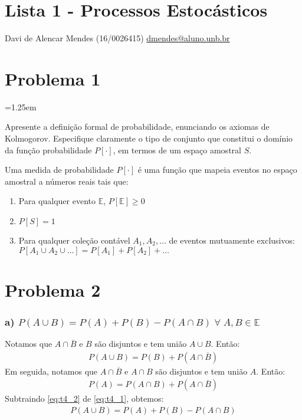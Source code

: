 \documentclass{article}
\newcommand\ov[1]{\overline{#1}}
\newenvironment{nscenter}
 {\parskip=1.25em\par\nopagebreak\centering}
 {\par\noindent\ignorespacesafterend}
\begin{document}
\setlength{\abovedisplayskip}{12pt}
\setlength{\belowdisplayskip}{12pt}
\setlength{\abovedisplayshortskip}{0pt}
\setlength{\belowdisplayshortskip}{0pt}
\setlength{\jot}{0pt}

\section*{Lista 1 - Processos Estocásticos}
Davi de Alencar Mendes (16/0026415) \url{dmendes@aluno.unb.br}
\\
\section*{Problema 1}
\begin{nscenter}
Apresente a definição formal de probabilidade, enunciando os axiomas de Kolmogorov. Especifique
claramente o tipo de conjunto que constitui o domínio da função probabilidade $P[\cdot]$, em termos
de um espaço amostral $S$.
\end{nscenter}
Uma medida de probabilidade $P[\cdot]$ é uma função que mapeia eventos no espaço amostral a
números reais tais que:

\begin{enumerate}
    \setlength\itemsep{0em}
    \item Para qualquer evento $\mathbb{E}$, $P[\mathbb{E}] \geq 0$
    \item $P[S] = 1$
    \item Para qualquer coleção contável $A_1, A_2,\ldots$ de eventos mutuamente exclusivos:\\ $P[A_1
        \cup A_2 \cup \ldots] = P[A_1] + P[A_2] + \ldots$
\end{enumerate}

\section*{Problema 2}
\subsubsection*{a) $P(A \cup B) = P(A) + P(B) - P(A \cap B) \; \forall \; A,B \in \mathbb{E}$}
Notamos que $A \cap \ov{B}$ e $B$ são disjuntos e tem união $A \cup B$. Então:
\begin{align}
    P(A \cup B) = P(B) + P(A \cap \ov{B}) \label{eq:t4_1}
\end{align}
Em seguida, notamos que $A \cap \ov{B}$ e $A \cap B$ são disjuntos e tem união $A$. Então:
\begin{align}
    P(A) = P(A \cap B) + P(A \cap \ov{B}) \label{eq:t4_2}
\end{align}
Subtraindo \ref{eq:t4_2} de \ref{eq:t4_1}, obtemos:
\begin{align*}
    P(A \cup B) = P(A) + P(B) - P(A \cap B)
\end{align*}
\end{document}
